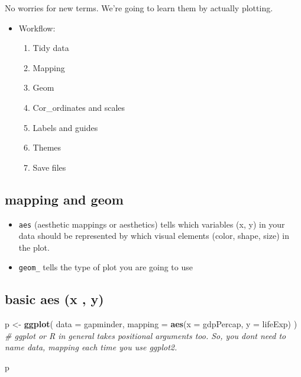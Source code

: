 \documentclass[
]{book}
\newenvironment{Shaded}{\begin{snugshade}}{\end{snugshade}}
\newcommand{\CommentTok}[1]{\textcolor[rgb]{0.56,0.35,0.01}{\textit{#1}}}
\newcommand{\DataTypeTok}[1]{\textcolor[rgb]{0.13,0.29,0.53}{#1}}
\newcommand{\KeywordTok}[1]{\textcolor[rgb]{0.13,0.29,0.53}{\textbf{#1}}}
\newcommand{\NormalTok}[1]{#1}
\newcommand{\StringTok}[1]{\textcolor[rgb]{0.31,0.60,0.02}{#1}}
\providecommand{\tightlist}{%
  \setlength{\itemsep}{0pt}\setlength{\parskip}{0pt}}
\begin{document}
No worries for new terms. We're going to learn them by actually plotting.

\begin{itemize}
\item
  Workflow:

  \begin{enumerate}
  \def\labelenumi{\arabic{enumi}.}
  \tightlist
  \item
    Tidy data
  \item
    Mapping
  \item
    Geom
  \item
    Cor\_ordinates and scales
  \item
    Labels and guides
  \item
    Themes
  \item
    Save files
  \end{enumerate}
\end{itemize}

\hypertarget{mapping-and-geom}{%
\subsection{mapping and geom}\label{mapping-and-geom}}

\begin{itemize}
\item
  \texttt{aes} (aesthetic mappings or aesthetics) tells which variables (x, y) in your data should be represented by which visual elements (color, shape, size) in the plot.
\item
  \texttt{geom\_} tells the type of plot you are going to use
\end{itemize}

\hypertarget{basic-aes-x-y}{%
\subsection{basic aes (x , y)}\label{basic-aes-x-y}}

\begin{Shaded}
\begin{Highlighting}[]
\NormalTok{p \textless{}{-}}\StringTok{ }\KeywordTok{ggplot}\NormalTok{(}
  \DataTypeTok{data =}\NormalTok{ gapminder,}
  \DataTypeTok{mapping =} \KeywordTok{aes}\NormalTok{(}\DataTypeTok{x =}\NormalTok{ gdpPercap, }\DataTypeTok{y =}\NormalTok{ lifeExp)}
\NormalTok{) }\CommentTok{\# ggplot or R in general takes positional arguments too. So, you don\textquotesingle{}t need to name data, mapping each time you use ggplot2.}

\NormalTok{p}
\end{Highlighting}
\end{Shaded}
\end{document}
